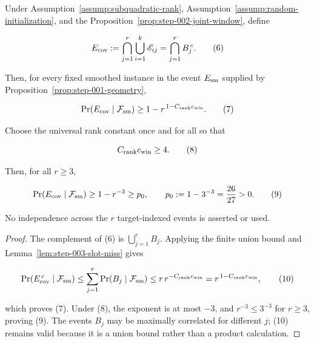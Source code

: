 \begin{proposition}\label{prop:step-003-coupon}
Under Assumption~\ref{assump:subquadratic-rank}, Assumption~\ref{assump:random-initialization},
and the Proposition~\ref{prop:step-002-joint-window}, define

\[
E_{\rm cov}:=\bigcap_{j=1}^r\bigcup_{i=1}^k\mathscr E_{ij}
   =\bigcap_{j=1}^r B_j^{\,c}.
\tag{6}
\]

Then, for every fixed smoothed instance in the event
$E_{\rm sm}$ supplied by Proposition~\ref{prop:step-001-geometry},

\[
\Pr(E_{\rm cov}\mid\mathcal F_{\rm sm})
\ge 1-r^{\,1-C_{\rm rank}c_{\rm win}}.
\tag{7}
\]

Choose the universal rank constant once and for all so that

\[
C_{\rm rank}c_{\rm win}\ge4.
\tag{8}
\]

Then, for all \(r\ge3\),

\[
\Pr(E_{\rm cov}\mid\mathcal F_{\rm sm})\ge1-r^{-3}\ge
p_0,\qquad p_0:=1-3^{-3}={26\over27}>0.
\tag{9}
\]

No independence across the \(r\) target-indexed events is asserted or used.

\begin{proof}
The complement of (6) is \(\bigcup_{j=1}^rB_j\). Applying the finite
union bound and Lemma~\ref{lem:step-003-slot-miss} gives

\[
\Pr(E_{\rm cov}^{\,c}\mid\mathcal F_{\rm sm})
\le\sum_{j=1}^r\Pr(B_j\mid\mathcal F_{\rm sm})
\le r\,r^{-C_{\rm rank}c_{\rm win}}
=r^{\,1-C_{\rm rank}c_{\rm win}},
\tag{10}
\]

which proves (7). Under (8), the exponent is at most \(-3\), and
\(r^{-3}\le3^{-3}\) for \(r\ge3\), proving (9). The events \(B_j\) may be
maximally correlated for different \(j\); (10) remains valid because it is a
union bound rather than a product calculation. 


\end{proof}
\end{proposition}

